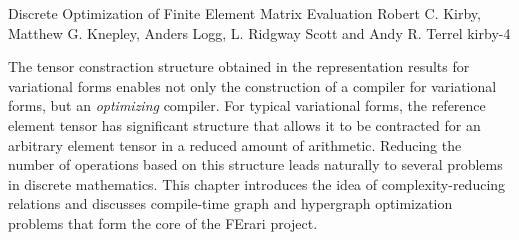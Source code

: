               {Discrete Optimization of Finite Element Matrix Evaluation}
              {Robert C. Kirby, Matthew G. Knepley, Anders Logg, L. Ridgway Scott and Andy R. Terrel}
              {kirby-4}

The tensor constraction structure obtained in the representation
results for variational forms enables not only the construction of a
compiler for variational forms, but an \emph{optimizing} compiler.
For typical variational forms, the reference element tensor has
significant structure that allows it to be contracted for an arbitrary
element tensor in a reduced amount of arithmetic.  Reducing the number
of operations based on this structure leads naturally to several
problems in discrete mathematics.  This chapter introduces the idea of
complexity-reducing relations and discusses compile-time graph and
hypergraph optimization problems that form the core of the FErari
project.
